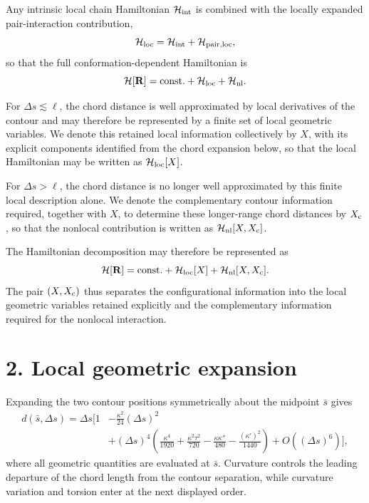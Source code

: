 \documentclass[11pt]{article}
\begin{document}
Any intrinsic local chain Hamiltonian \(\mathcal H_{\rm int}\) is combined with the locally expanded pair-interaction contribution,
\begin{equation}
\mathcal H_{\rm loc}
=
\mathcal H_{\rm int}
+
\mathcal H_{\rm pair,loc},
\end{equation}
so that the full conformation-dependent Hamiltonian is
\begin{equation}
\mathcal H[\mathbf R]
=
\mathrm{const.}
+
\mathcal H_{\rm loc}
+
\mathcal H_{\rm nl}.
\label{eq:H_decomposition}
\end{equation}

For \(\Delta s\lesssim\ell\), the chord distance is well approximated by local derivatives of the contour and may therefore be represented by a finite set of local geometric variables. We denote this retained local information collectively by \(X\), with its explicit components identified from the chord expansion below, so that the local Hamiltonian may be written as \(\mathcal H_{\rm loc}[X]\).

For \(\Delta s>\ell\), the chord distance is no longer well approximated by this finite local description alone. We denote the complementary contour information required, together with \(X\), to determine these longer-range chord distances by \(X_{\rm c}\), so that the nonlocal contribution is written as \(\mathcal H_{\rm nl}[X,X_{\rm c}]\).

The Hamiltonian decomposition may therefore be represented as
\begin{equation}
\mathcal H[\mathbf R]
=
\mathrm{const.}
+
\mathcal H_{\rm loc}[X]
+
\mathcal H_{\rm nl}[X,X_{\rm c}].
\end{equation}
The pair \((X,X_{\rm c})\) thus separates the configurational information into the local geometric variables retained explicitly and the complementary information required for the nonlocal interaction.

\section*{2. Local geometric expansion}

Expanding the two contour positions symmetrically about the midpoint \(\bar{s}\) gives
\begin{align}
d(\bar{s},\Delta s)
=\Delta s\Bigg[1
&-\frac{\kappa^2}{24}(\Delta s)^2
\nonumber\\
&+(\Delta s)^4\left(
\frac{\kappa^4}{1920}
+\frac{\kappa^2\tau^2}{720}
-\frac{\kappa\kappa''}{480}
-\frac{(\kappa')^2}{1440}
\right)
+O((\Delta s)^6)\Bigg],
\label{eq:rw_midpoint_chord_expansion}
\end{align}
where all geometric quantities are evaluated at \(\bar{s}\). Curvature controls the leading departure of the chord length from the contour separation, while curvature variation and torsion enter at the next displayed order.
\end{document}
